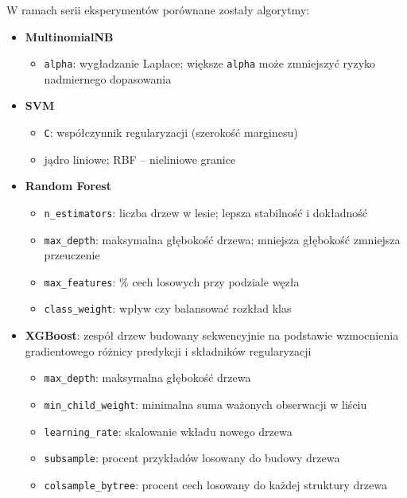 \documentclass{article}
\begin{document}
W ramach serii eksperymentów porównane zostały algorytmy:
\begin{itemize}
    \item \textbf{MultinomialNB}
    \begin{itemize}
        \item \texttt{alpha}: wygładzanie Laplace; większe \texttt{alpha} może zmniejszyć ryzyko nadmiernego dopasowania
    \end{itemize}
    
    \item \textbf{SVM}
    \begin{itemize}
        \item \texttt{C}: współczynnik regularyzacji (szerokość marginesu)
        \item jądro liniowe; RBF -- nieliniowe granice
    \end{itemize}

    \item \textbf{Random Forest}
    \begin{itemize}
        \item \texttt{n\_estimators}: liczba drzew w lesie; lepsza stabilność i dokładność
        \item \texttt{max\_depth}: maksymalna głębokość drzewa; mniejsza głębokość zmniejsza przeuczenie
        \item \texttt{max\_features}: \% cech losowych przy podziale węzła
        \item \texttt{class\_weight}: wpływ czy balansować rozkład klas
    \end{itemize}

    \item \textbf{XGBoost}: zespół drzew budowany sekwencyjnie na podstawie wzmocnienia gradientowego różnicy predykcji i składników regularyzacji
    \begin{itemize}
        \item \texttt{max\_depth}: maksymalna głębokość drzewa
        \item \texttt{min\_child\_weight}: minimalna suma ważonych obserwacji w liściu
        \item \texttt{learning\_rate}: skalowanie wkładu nowego drzewa
        \item \texttt{subsample}: procent przykładów losowany do budowy drzewa
        \item \texttt{colsample\_bytree}: procent cech losowany do każdej struktury drzewa
    \end{itemize}
\end{itemize}
\end{document}
